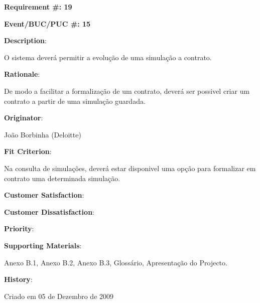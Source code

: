 \pagebreak

\begin{minipage}{0.55\textwidth}
\begin{flushleft}\textbf{Requirement \#: 19}\end{flushleft}
\end{minipage}
\begin{minipage}{0.4\textwidth}
\begin{flushright}\textbf{Event/BUC/PUC \#: 15}\end{flushright}
\end{minipage}

\begin{description}

\item \textbf{Description}:

O sistema deverá permitir a evolução de uma simulação a contrato.\\

\item \textbf{Rationale}:

De modo a facilitar a formalização de um contrato, deverá ser possivel criar um contrato a partir de uma simulação guardada.\\

\item \textbf{Originator}:

João Borbinha (Deloitte)\\

\item \textbf{Fit Criterion}:

Na consulta de simulações, deverá estar disponivel uma opção para formalizar em contrato uma determinada simulação.\\

\begin{minipage}{0.45\textwidth}
\begin{flushleft}\item \textbf{Customer Satisfaction}:\end{flushleft}
\end{minipage}
\begin{minipage}{0.45\textwidth}
\begin{flushleft}\item \textbf{Customer Dissatisfaction}:\end{flushleft}
\end{minipage}

\item \textbf{Priority}:\\

\item \textbf{Supporting Materials}:

Anexo B.1, Anexo B.2, Anexo B.3, Glossário, Apresentação do Projecto.\\

\item \textbf{History}:

Criado em 05 de Dezembro de 2009\\
\end{description}

